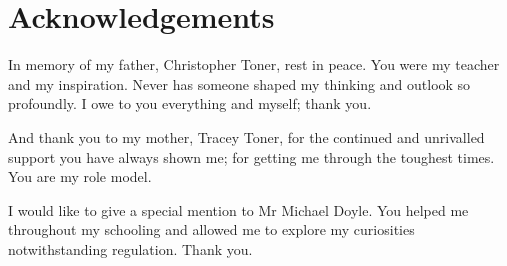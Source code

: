 \section*{Acknowledgements}

In memory of my father, Christopher Toner, rest in peace. You were my teacher and my inspiration. Never has someone shaped my thinking and outlook so profoundly. I owe to you everything and myself; thank you.

And thank you to my mother, Tracey Toner, for the continued and unrivalled support you have always shown me; for getting me through the toughest times. You are my role model.

I would like to give a special mention to Mr Michael Doyle. You helped me throughout my schooling and allowed me to explore my curiosities notwithstanding regulation. Thank you.